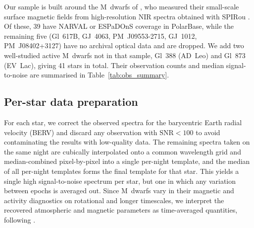 Our sample is built around the M~dwarfs of \citet{cristofari_2023b}, who measured their small-scale surface magnetic fields from high-resolution NIR spectra obtained with SPIRou \citep{spirou}. Of these, 39 have NARVAL or ESPaDOnS coverage in PolarBase, while the remaining five (Gl~617B, GJ~4063, PM~J09553-2715, GJ~1012, PM~J08402+3127) have no archival optical data and are dropped. We add two well-studied active M~dwarfs not in that sample, Gl~388 (AD~Leo) and Gl~873 (EV~Lac), giving 41 stars in total. Their observation counts and median signal-to-noise are summarised in Table~\ref{tab:obs_summary}.



\subsection{Per-star data preparation}
\label{sec:obs_preparation}


For each star, we correct the observed spectra for the barycentric Earth radial velocity (BERV) and discard any observation with $\mathrm{SNR}<100$ to avoid contaminating the results with low-quality data. The remaining spectra taken on the same night are cubically interpolated onto a common wavelength grid and median-combined pixel-by-pixel into a single per-night template, and the median of all per-night templates forms the final template for that star. This yields a single high signal-to-noise spectrum per star, but one in which any variation between epochs is averaged out. Since M~dwarfs vary in their magnetic and activity diagnostics on rotational and longer timescales, we interpret the recovered atmospheric and magnetic parameters as time-averaged quantities, following \citet{Passegger_2019, reiners+2022, cristofari+2022b, cristofari_2023b}.

